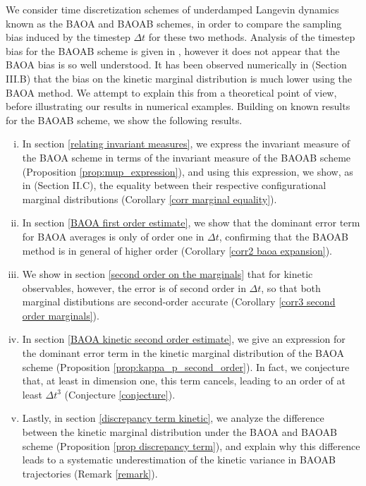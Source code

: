 We consider time discretization schemes of underdamped Langevin dynamics known as the BAOA and BAOAB schemes, in order to compare the sampling bias induced by the timestep $\Delta t$ for these two methods.
Analysis of the timestep bias for the BAOAB scheme is given in \cite{LMS13}, however it does not appear that the BAOA bias is so well understood.
It has been observed numerically in \cite{KK22} (Section III.B) that the bias on the kinetic marginal distribution is much lower using the BAOA method. We attempt to explain this from a theoretical point of view, before illustrating our results in numerical examples.
 Building on known results for the BAOAB scheme, we show the following results.
\begin{enumerate}[(i)]
  \item In section \ref{relating invariant measures}, we express the invariant measure of the BAOA scheme in terms of the invariant measure of the BAOAB scheme (Proposition \ref{prop:mup_expression}), and using this expression, we show, as in \cite{KK22} (Section II.C), the equality between their respective configurational marginal distributions (Corollary \ref{corr marginal equality}). 
  \item In section \ref{BAOA first order estimate}, we show that the dominant error term for BAOA averages is only of order one in $\Delta t$, confirming that the BAOAB method is in general of higher order (Corollary \ref{corr2 baoa expansion}). 
  \item We show in section \ref{second order on the marginals} that for kinetic observables, however, the error is of second order in $\Delta t$, so that both marginal distibutions are second-order accurate (Corollary \ref{corr3 second order marginals}). 
  \item In section \ref{BAOA kinetic second order estimate}, we give an expression for the dominant error term in the kinetic marginal distribution of the BAOA scheme (Proposition \ref{prop:kappa_p_second_order}). In fact, we conjecture that, at least in dimension one, this term cancels, leading to an order of at least $\Delta t^3$ (Conjecture \ref{conjecture}).
  \item Lastly, in section \ref{discrepancy term kinetic}, we analyze the difference between the kinetic marginal distribution under the BAOA and BAOAB scheme (Proposition \ref{prop discrepancy term}), and explain why this difference leads to a systematic underestimation of the kinetic variance in BAOAB trajectories (Remark \ref{remark}).
\end{enumerate}

